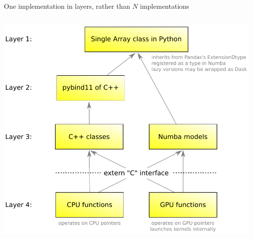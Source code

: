 \documentclass[aspectratio=169]{beamer}
\begin{document}
\begin{frame}{One implementation in layers, rather than $N$ implementations}
\vspace{0.4 cm}
\begin{columns}
\includegraphics[width=\linewidth]{awkward-1-0-layers.pdf}
\end{columns}
\end{frame}
\end{document}
